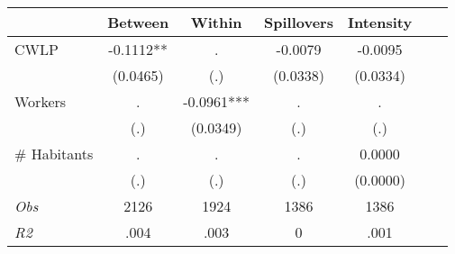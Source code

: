 \begin{tabular}{l*{6}{c}}\hline&\multicolumn{1}{c}{Between}&\multicolumn{1}{c}{Within}&\multicolumn{1}{c}{Spillovers}&\multicolumn{1}{c}{Intensity}\\ \hline 
CWLP & -0.1112** & . & -0.0079 & -0.0095 \\
 & (0.0465) & (.) & (0.0338) & (0.0334) \\
Workers & . & -0.0961*** & . & . \\
 & (.) & (0.0349) & (.) & (.) \\
\# Habitants & . & . & . & 0.0000 \\
  & (.) & (.) & (.) & (0.0000) \\
\hline \textit{Obs} & 2126 & 1924 & 1386 & 1386  \\ \textit{R2} & .004 & .003 & 0 & .001 \\ \hline \end{tabular}
